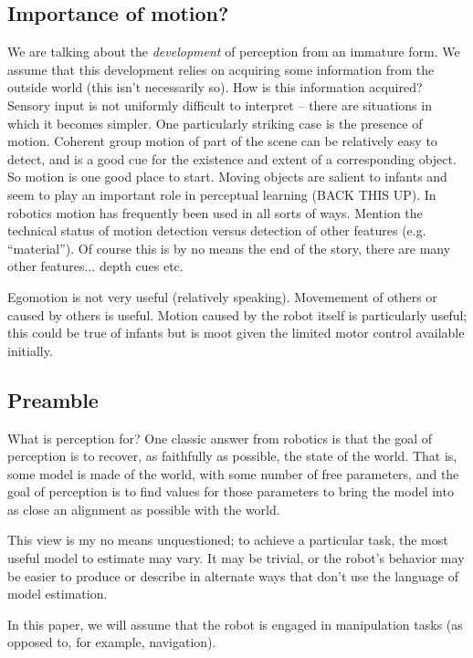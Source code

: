 \subsection{Importance of motion?}

We are talking about the {\em development} of perception from an
immature form.  We assume that this development relies on acquiring
some information from the outside world (this isn't necessarily so).
How is this information acquired?  Sensory input is not 
uniformly difficult to interpret -- there are situations in
which it becomes simpler.  One particularly striking case is
the presence of motion.  Coherent group motion of part of the 
scene can be relatively easy to detect, and is a good cue for
the existence and extent of a corresponding object.  
So motion is one good place to start.
%
Moving objects are salient to infants and seem to play an
important role in perceptual learning (BACK THIS UP).
%
In robotics motion has frequently been used in all sorts of
ways.
%
Mention the technical status of motion detection versus
detection of other features (e.g. ``material'').
%
Of course this is by no means the end of the story, there 
are many other features... depth cues etc.

Egomotion is not very useful (relatively speaking).  Movemement of
others or caused by others is useful.  Motion caused by the robot
itself is particularly useful; this could be true of infants but is
moot given the limited motor control available initially.

\subsection{Preamble}

What is perception for?  One classic answer from robotics is that the
goal of perception is to recover, as faithfully as possible, the state
of the world.  That is, some model is made of the world, with some
number of free parameters, and the goal of perception is to find
values for those parameters to bring the model into as close an
alignment as possible with the world.

This view is my no means unquestioned; to achieve a particular
task, the most useful model to estimate may vary.  It may be
trivial, or the robot's behavior may be easier to produce or
describe in alternate ways that don't use the language of
model estimation.

In this paper, we will assume that the robot is engaged
in manipulation tasks (as opposed to, for example, navigation).

